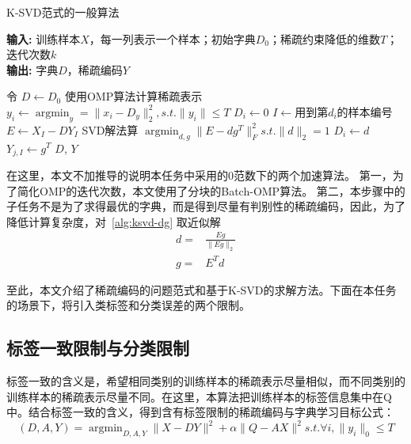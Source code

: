     \begin{algorithm}[b]
    \caption{K-SVD范式的一般算法} %
    \hspace*{0.02in} {\bf 输入:} %
    训练样本$X $，每一列表示一个样本；初始字典$D_0$；稀疏约束降低的维数$T$；迭代次数$k$ \\
    \hspace*{0.02in} {\bf 输出:} %
    字典$D$，稀疏编码$Y$
    \begin{algorithmic}[1]
    \State 令 $D \leftarrow D_0$
            \State 使用OMP算法计算稀疏表示 $y_i \leftarrow \mathop{\arg\min}_{y} = \|x_i - D_y\| ^2_2, s.t. \|y_i\| \le T $  \label{alg:line:omp}
        \EndFor
            \State $D_i \leftarrow 0$
            \State $I \leftarrow 用到第d_i的样本编号$
            \State $E \leftarrow X_I - D Y_I$
            \State SVD解法算 $\mathop{\arg\min}_{d, g}\|E - dg^T\|^2 _F s.t. \|d\|_2 = 1 $\label{alg:line:appro}
            \State $D_i \leftarrow d$
            \State $Y_{j, I} \leftarrow g^T$
        \EndFor
    \EndFor
    \State \Return $D$, $Y$
    \end{algorithmic}
    \label{alg:ksvdAlg}
    \end {algorithm}

    在这里，本文不加推导的说明本任务中采用的0范数下的两个加速算法。
    第一，为了简化OMP的迭代次数，本文使用了分块的Batch-OMP算法\cite{rubinstein2008efficient}。
    第二，本步骤中的子任务不是为了求得最优的字典，而是得到尽量有判别性的稀疏编码，因此，为了降低计算复杂度，对~\ref{alg:ksvd-dg} 取近似解
    \begin{equation}
    \begin{split}
    d = & \frac{Eg}{\|Eg\|_2} \\
    g = & E^T d
    \end{split}
    \end{equation}

    至此，本文介绍了稀疏编码的问题范式和基于K-SVD的求解方法。下面在本任务的场景下，将引入类标签和分类误差的两个限制。

    

    \subsection{标签一致限制与分类限制}
    \label{sec:ksvd-constraint}
    标签一致的含义是，希望相同类别的训练样本的稀疏表示尽量相似，而不同类别的训练样本的稀疏表示尽量不同。在这里，本算法把训练样本的标签信息集中在Q中。结合标签一致的含义，得到含有标签限制的稀疏编码与字典学习目标公式：
    \begin{equation}
    \label{alg:lc-ksvd1}
    (D, A, Y) = \mathop{\arg \min} _{D, A, Y} \|X - DY\| ^ 2 + \alpha\|Q - AX\|^2 s.t. \forall i, \|y_i\|_0 \le T
    \end{equation}

